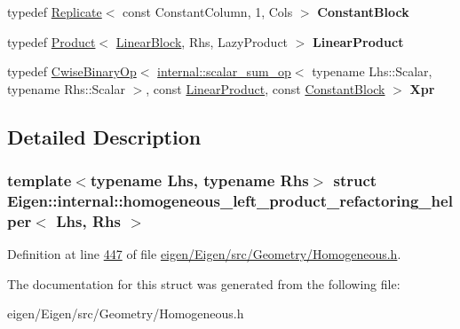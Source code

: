 \begin{DoxyCompactItemize}
typedef \hyperlink{group___core___module_class_eigen_1_1_replicate}{Replicate}$<$ const Constant\+Column, 1, Cols $>$ {\bfseries Constant\+Block}
\item 
\mbox{\label{struct_eigen_1_1internal_1_1homogeneous__left__product__refactoring__helper_a97831c144fe512df2f7b5ec49b84252a}} 
typedef \hyperlink{group___core___module_class_eigen_1_1_product}{Product}$<$ \hyperlink{group___sparse_core___module}{Linear\+Block}, Rhs, Lazy\+Product $>$ {\bfseries Linear\+Product}
\item 
\mbox{\label{struct_eigen_1_1internal_1_1homogeneous__left__product__refactoring__helper_a68553e6f8fe9b5704607444a3fc1f96e}} 
typedef \hyperlink{group___core___module_class_eigen_1_1_cwise_binary_op}{Cwise\+Binary\+Op}$<$ \hyperlink{struct_eigen_1_1internal_1_1scalar__sum__op}{internal\+::scalar\+\_\+sum\+\_\+op}$<$ typename Lhs\+::\+Scalar, typename Rhs\+::\+Scalar $>$, const \hyperlink{group___core___module_class_eigen_1_1_product}{Linear\+Product}, const \hyperlink{group___core___module_class_eigen_1_1_replicate}{Constant\+Block} $>$ {\bfseries Xpr}
\end{DoxyCompactItemize}


\subsection{Detailed Description}
\subsubsection*{template$<$typename Lhs, typename Rhs$>$\newline
struct Eigen\+::internal\+::homogeneous\+\_\+left\+\_\+product\+\_\+refactoring\+\_\+helper$<$ Lhs, Rhs $>$}



Definition at line \hyperlink{eigen_2_eigen_2src_2_geometry_2_homogeneous_8h_source_l00447}{447} of file \hyperlink{eigen_2_eigen_2src_2_geometry_2_homogeneous_8h_source}{eigen/\+Eigen/src/\+Geometry/\+Homogeneous.\+h}.



The documentation for this struct was generated from the following file\+:\begin{DoxyCompactItemize}
\item 
eigen/\+Eigen/src/\+Geometry/\+Homogeneous.\+h\end{DoxyCompactItemize}
